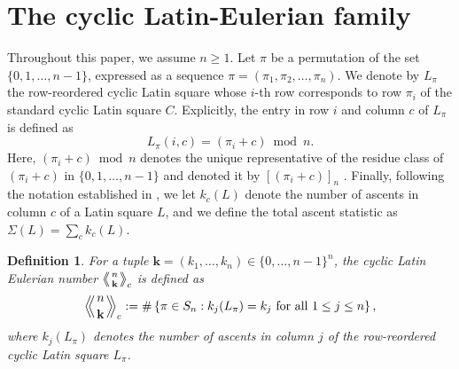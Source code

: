 \documentclass[11pt,a4paper]{amsart}
\newtheorem{definition}[theorem]{Definition}
\newcommand{\1}{\mathbf{1}}
\newcommand{\LE}[1]{\left\langle\!\!\left\langle #1 \right\rangle\!\!\right\rangle}
\begin{document}
\section{The cyclic Latin-Eulerian family}
Throughout this paper, we assume $n \ge 1$. Let $\pi$ be a permutation of the set $\{0, 1, \dots, n-1\}$, expressed as a sequence $\pi = (\pi_1, \pi_2, \dots, \pi_n)$. We denote by $L_\pi$ the row-reordered cyclic Latin square whose $i$-th row corresponds to row $\pi_i$ of the standard cyclic Latin square $C$. Explicitly, the entry in row $i$ and column $c$ of $L_\pi$ is defined as
 \[L_\pi(i,c) = (\pi_i + c) \bmod n.\]
Here, $(\pi_i + c) \bmod n$ denotes the unique representative of the residue class of $(\pi_i + c)$ in $\{0, 1, \dots, n-1\}$ and denoted it by $[(\pi_i + c)]_n$ . Finally, following the notation established in \cite{LEN}, we let $k_c(L)$ denote the number of ascents in column $c$ of a Latin square $L$, and we define the total ascent statistic as $\Sigma(L) = \sum_{c} k_c(L)$.
\begin{definition}
For a tuple $\mathbf{k} = (k_1, \dots, k_n) \in \{0, \dots, n-1\}^n$, the \emph{cyclic Latin Eulerian number} $\LE{n \atop \mathbf{k}}_c$ is defined as
\[
\LE{n \atop \mathbf{k}}_c := \#\left\{ \pi \in S_n : k_j(L_\pi) = k_j \text{ for all } 1 \le j \le n \right\},
\]
where $k_j(L_\pi)$ denotes the number of ascents in column $j$ of the row-reordered cyclic Latin square $L_\pi$.
\end{definition}
\end{document}
